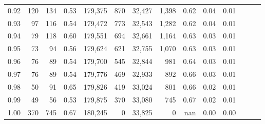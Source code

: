 \begin{tabular}{rrrrrrrrrrrrrr}
0.92 &    120 &  134 &  0.53 &  179,375 &      870 &  32,427 &   1,398 &  0.62 &  0.04 &      0.01 \\
0.93 &     97 &  116 &  0.54 &  179,472 &      773 &  32,543 &   1,282 &  0.62 &  0.04 &      0.01 \\
0.94 &     79 &  118 &  0.60 &  179,551 &      694 &  32,661 &   1,164 &  0.63 &  0.03 &      0.01 \\
0.95 &     73 &   94 &  0.56 &  179,624 &      621 &  32,755 &   1,070 &  0.63 &  0.03 &      0.01 \\
0.96 &     76 &   89 &  0.54 &  179,700 &      545 &  32,844 &     981 &  0.64 &  0.03 &      0.01 \\
0.97 &     76 &   89 &  0.54 &  179,776 &      469 &  32,933 &     892 &  0.66 &  0.03 &      0.01 \\
0.98 &     50 &   91 &  0.65 &  179,826 &      419 &  33,024 &     801 &  0.66 &  0.02 &      0.01 \\
0.99 &     49 &   56 &  0.53 &  179,875 &      370 &  33,080 &     745 &  0.67 &  0.02 &      0.01 \\
1.00 &    370 &  745 &  0.67 &  180,245 &        0 &  33,825 &       0 &   nan &  0.00 &      0.00 \\
\bottomrule
\end{tabular}
